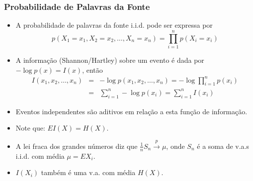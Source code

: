 \begin{frame}%
  \frametitle{Probabilidade de Palavras da Fonte}
  \begin{itemize}
  \item A probabilidade de palavras da fonte i.i.d. pode ser expressa por
        \begin{equation}
        p(X_1 = x_1, X_2 = x_2, \ldots, X_n = x_n) = \prod_{i=1}^{n} p(X_i = x_i)
        \end{equation}
  \item A informação (Shannon/Hartley) sobre um evento é dada por $-\log p(x) = I(x)$, então
        \begin{eqnarray}
        I(x_1,x_2,\ldots,x_n) &=& - \log p(x_1, x_2, \ldots, x_n) = - \log \prod_{i=1}^n p(x_i) \nonumber \\
                        &=& \sum_{i=1}^n - \log p(x_i) = \sum_{i=1}^n I(x_i)
        \end{eqnarray}
  \item Eventos independentes são aditivos em relação a esta função de informação.
  \item Note que: $E I(X) = H(X)$.
  \item A lei fraca dos grandes números diz que $\frac{1}{n} S_n \xrightarrow{p} \mu$, onde $S_n$ é a soma
        de v.a.s i.i.d. com média $\mu = E X_i$.
  \item $I(X_i)$ também é uma v.a. com média $H(X)$.
  \end{itemize}
\end{frame}

